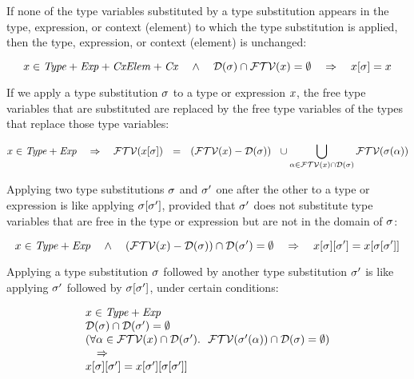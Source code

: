 If none of the type variables substituted by a type substitution appears in
the type, expression, or context (element) to which the type substitution is
applied, then the type, expression, or context (element) is unchanged:

\begin{theorem}\label{thm-tsbs-not-free}
\[
x\in\mathit{Type}+\mathit{Exp}+\mathit{CxElem}+\mathit{Cx}
\ \ \ \wedge\ \ \
\mathcal{D}(\sigma)\cap\mathcal{FTV}(x)=\emptyset
\ \ \ \Rightarrow\ \ \
x[\sigma]=x
\]
\end{theorem}

If we apply a type substitution $\sigma$ to a type or expression $x$, the
free type variables that are substituted are replaced by the free type
variables of the types that replace those type variables:

\begin{theorem}\label{thm-ftvar-of-tsbs}
\[
x\in\mathit{Type}+\mathit{Exp}
\ \ \ \Rightarrow\ \ \
\mathcal{FTV}(x[\sigma])
\ \ =\ \
(\mathcal{FTV}(x)-\mathcal{D}(\sigma))
\ \ \cup
\bigcup_{\alpha\in\mathcal{FTV}(x)\cap\mathcal{D}(\sigma)}\mathcal{FTV}(\sigma(\alpha))
\]
\end{theorem}

Applying two type substitutions $\sigma$ and $\sigma'$ one after the other
to a type or expression is like applying $\sigma[\sigma']$,
provided that $\sigma'$ does not substitute type variables that are free in
the type or expression but are not in the domain of $\sigma$:

\begin{theorem}\label{thm-tsbs-tsbs}
\[
x\in\mathit{Type}+\mathit{Exp}
\ \ \ \wedge\ \ \
(\mathcal{FTV}(x)-\mathcal{D}(\sigma))\cap\mathcal{D}(\sigma')=\emptyset
\ \ \ \Rightarrow\ \ \
x[\sigma][\sigma'] =
x[\sigma[\sigma']]
\]
\end{theorem}

Applying a type substitution $\sigma$ followed by another type substitution
$\sigma'$ is like applying $\sigma'$ followed by
$\sigma[\sigma']$, under certain conditions:

\begin{theorem}\label{thm-tsbs-tsbs2}
\[
\begin{array}{l}
x\in\mathit{Type}+\mathit{Exp}
\\
\mathcal{D}(\sigma)\cap\mathcal{D}(\sigma')=\emptyset
\\
(\forall\alpha\in\mathcal{FTV}(x)\cap\mathcal{D}(\sigma').\ \ \mathcal{FTV}(\sigma'(\alpha))\cap\mathcal{D}(\sigma)=\emptyset)
\\
\ \ \ \Rightarrow\ \\
x[\sigma][\sigma'] =
x[\sigma'][\sigma[\sigma']]
\end{array}
\]
\end{theorem}

